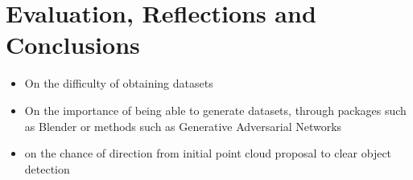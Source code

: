 

\chapter{Evaluation, Reflections and Conclusions}
\label{Eval}

\begin{itemize}
    \item On the difficulty of obtaining datasets
    \item On the importance of being able to generate datasets, through packages such as Blender or methods such as Generative Adversarial Networks
    \item on the chance of direction from initial point cloud proposal to clear object detection    
\end{itemize}

\lipsum[1]
